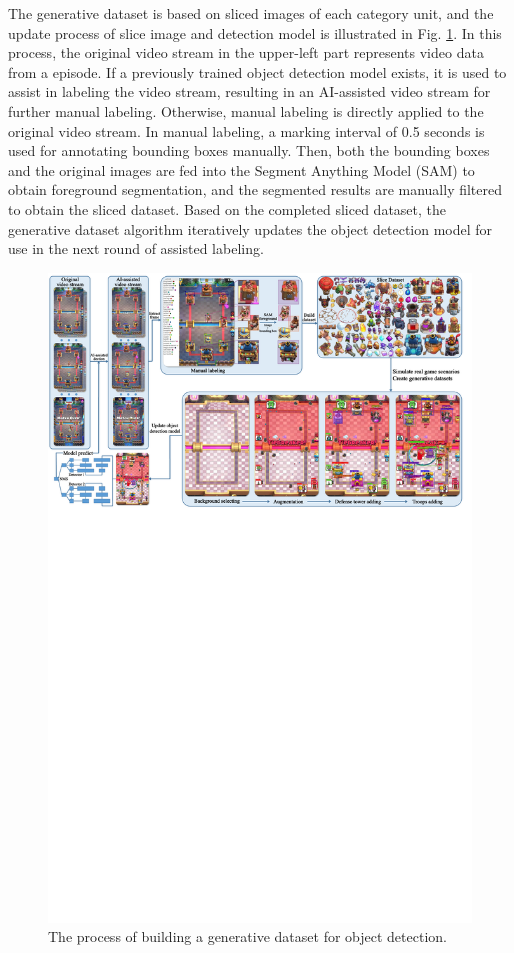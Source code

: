 \documentclass[runningheads]{llncs}
\newcounter{algorithm}
\begin{document}
The generative dataset is based on sliced images of each category unit,  %
and the update process of slice image and detection model is illustrated in
Fig. \ref{fig-generation-dataset}. In this process,
the original video stream in the upper-left part represents video data from a episode.
If a previously trained object detection model exists, it is used to assist in labeling the video stream,
resulting in an AI-assisted video stream for further manual labeling.
Otherwise, manual labeling is directly applied to the original video stream.
In manual labeling, a marking interval of 0.5 seconds is used for annotating bounding boxes manually.
Then, both the bounding boxes and the original images are fed into the Segment Anything Model (SAM) \cite{SAM} to obtain foreground segmentation,
and the segmented results are manually filtered to obtain the sliced dataset.
Based on the completed sliced dataset,
the generative dataset algorithm iteratively updates the object detection model for use in the next round of assisted labeling.
\begin{figure}[htbp]
  \centering\vspace{-1ex}
  \includegraphics[width=\textwidth]{figures/detection_dataset_building.pdf}
  \caption{The process of building a generative dataset for object detection.}\label{fig-generation-dataset}
\end{figure}
\end{document}
